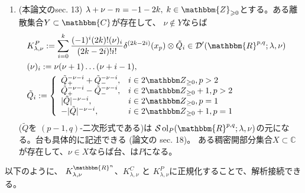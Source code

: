 \documentclass[a4paper,10pt]{article} %
\newcommand{\assign}{:=}
\newcommand{\nin}{\not\in}
\newcommand{\tmop}[1]{\ensuremath{\operatorname{#1}}}
\begin{document}
{\begin{enumerate}
 \item (本論文のsec. 13) $\lambda + \nu - n = - 1 - 2 k, \; k \in
 \mathbbm{Z}_{\geqslant 0}$とする。ある離散集合$Y\subset\mathbbm{C}$が存在して、
 $\nu\nin Y$ならば
 \begin{eqnarray}
 & K^P_{\lambda, \nu} \assign \sum_{i = 0}^k \frac{(- 1)^i (2 k) !
 (\nu)_i}{(2 k - 2 i) !i!} \delta^{(2 k - 2 i)} (x_p) \otimes \tilde{Q}_i
 \in \mathcal{D}' ( \mathbbm{R}^{p, q} ; \lambda, \nu) & \nonumber\\
 & (\nu)_i \assign \nu (\nu + 1) \ldots (\nu + i - 1), & \nonumber\\
 & \tilde{Q}_i \assign \left\{ \begin{array}{ll}
 \tilde{Q}_+^{- \nu - i} + \tilde{Q}_-^{- \nu - i}, & i \in 2 \Z_{\ge 0},
 p > 2\\
 \tilde{Q}_+^{- \nu - i} - \tilde{Q}_-^{- \nu - i}, & i \in 2 \Z_{\ge 0}
 + 1, p > 2\\
 | \tilde{Q} |^{- \nu - i}, & i \in 2 \Z_{\ge 0}, p = 1\\
 - | \tilde{Q} |^{- \nu - i}, & i \in 2 \Z_{\ge 0} + 1, p = 1
 \end{array} \right. & \nonumber
 \end{eqnarray}
 ($\tilde{Q}$を $( p - 1, q)$-二次形式である)は
 $\mathcal{S} \tmop{ol}_P ( \mathbbm{R}^{p, q} ; \lambda, \nu)$の元になる。台も具体的に記述できる
 (論文の sec. 18)。
 ある稠密開部分集合$X\subset\mathbb{C}$が存在して、$\nu\in X$ならば台、は$P$になる。
\end{enumerate}}{\hspace*{\fill}}{\medskip}

以下のように、
$K_{\lambda,
\nu}^{\mathbbm{R}^n}$、$K_{\lambda, \nu}^C$ と $K_{\lambda, \nu}^P$に正規化することで、解析接続できる。
\end{document}
